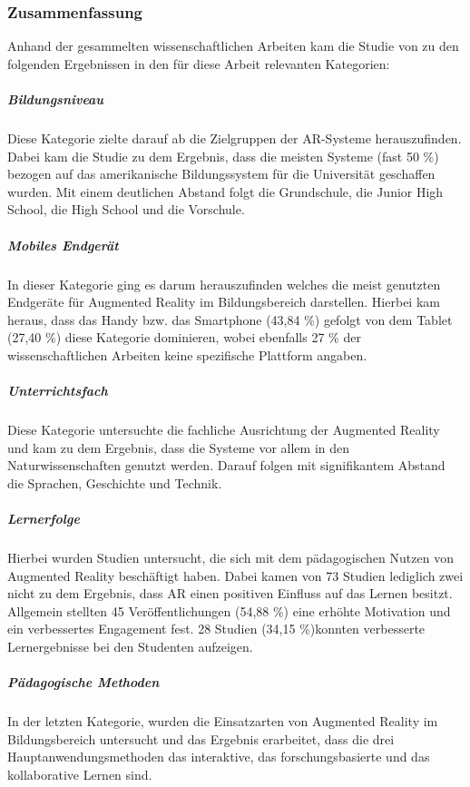 \subsubsection{Zusammenfassung}
Anhand der gesammelten wissenschaftlichen Arbeiten kam die Studie von \citeauthor{hedberg:review-ar-learning} zu den folgenden Ergebnissen in den für diese Arbeit relevanten Kategorien:

\subparagraph{Bildungsniveau}
Diese Kategorie zielte darauf ab die Zielgruppen der AR-Systeme herauszufinden. Dabei kam die Studie zu dem Ergebnis, dass die meisten Systeme (fast 50 \%) bezogen auf das amerikanische Bildungssystem für die Universität geschaffen wurden. Mit einem deutlichen Abstand folgt die Grundschule, die Junior High School, die High School und die Vorschule. \citep[S. 78]{hedberg:review-ar-learning}

\subparagraph{Mobiles Endgerät}
In dieser Kategorie ging es darum herauszufinden welches die meist genutzten Endgeräte für Augmented Reality im Bildungsbereich darstellen. Hierbei kam heraus, dass das Handy bzw. das Smartphone (43,84 \%) gefolgt von dem Tablet (27,40 \%) diese Kategorie dominieren, wobei ebenfalls 27 \% der wissenschaftlichen Arbeiten keine spezifische Plattform angaben. \citep[S. 80]{hedberg:review-ar-learning}

\subparagraph{Unterrichtsfach}
Diese Kategorie untersuchte die fachliche Ausrichtung der Augmented Reality und kam zu dem Ergebnis, dass die Systeme vor allem in den Naturwissenschaften genutzt werden. Darauf folgen mit signifikantem Abstand die Sprachen, Geschichte und Technik. \citep[S. 81]{hedberg:review-ar-learning}

\subparagraph{Lernerfolge}
Hierbei wurden Studien untersucht, die sich mit dem pädagogischen Nutzen von Augmented Reality beschäftigt haben. Dabei kamen von 73 Studien lediglich zwei nicht zu dem Ergebnis, dass AR einen positiven Einfluss auf das Lernen besitzt.\\
Allgemein stellten 45 Veröffentlichungen (54,88 \%) eine erhöhte Motivation und ein verbessertes Engagement fest. 28 Studien (34,15 \%)konnten verbesserte Lernergebnisse bei den Studenten aufzeigen.  \citep[S. 81-82]{hedberg:review-ar-learning}

\subparagraph{Pädagogische Methoden}
In der letzten Kategorie, wurden die Einsatzarten von Augmented Reality im Bildungsbereich untersucht und das Ergebnis erarbeitet, dass die drei Hauptanwendungsmethoden das interaktive, das forschungsbasierte und das kollaborative Lernen sind. \citep[S. 82]{hedberg:review-ar-learning}

